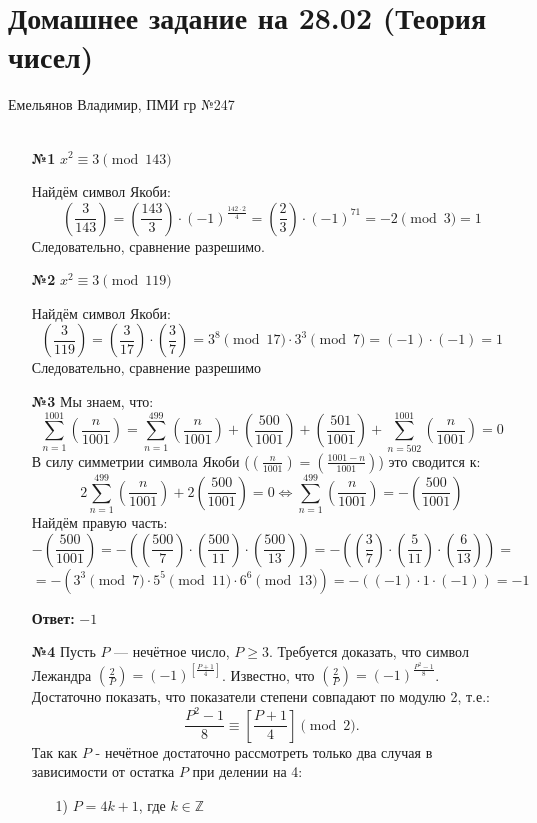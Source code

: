 \documentclass[a4paper]{article}
\renewcommand{\f}[2]{\frac{#1}{#2}}
\newcommand{\s}[2]{\sum\limits_{#1}^{#2}}
\newcommand{\lr}{\Leftrightarrow}
\renewcommand{\geq}{\geqslant}
\newcommand{\leg}[2]{\left(\f{#1}{#2}\right)}
\begin{document}
\section*{Домашнее задание на 28.02 (Теория чисел)}
 {\large Емельянов Владимир, ПМИ гр №247}\\\\
\begin{enumerate}
    \item[\textbf{№1}]$x^2 \equiv 3 \pmod{143}$
    
    Найдём символ Якоби:
    $$\leg{3}{143} = \leg{143}{3}\cdot (-1)^{\f{142\cdot2}{4}} = \leg{2}{3}\cdot (-1)^{71} = -2 \pmod{3} = 1$$
    Следовательно, сравнение разрешимо.

    \item[\textbf{№2}]$x^2 \equiv 3 \pmod{119}$
    
    Найдём символ Якоби:
    $$\leg{3}{119} = \leg{3}{17}\cdot \leg{3}{7} = 3^{8}\pmod{17} \cdot 3^{3}\pmod{7} = (-1) \cdot (-1) =1 $$
    Следовательно, сравнение разрешимо

    \item[\textbf{№3}]Мы знаем, что:
    $$\s{n=1}{1001}\leg{n}{1001} = \s{n=1}{499}\leg{n}{1001} +\leg{500}{1001}+\leg{501}{1001} +\s{n=502}{1001}\leg{n}{1001} = 0$$
    В силу симметрии символа Якоби ($\leg{n}{1001} = \leg{1001-n}{1001}$) это сводится к:
    $$2\s{n=1}{499}\leg{n}{1001} +2\leg{500}{1001} = 0 \lr  \s{n=1}{499}\leg{n}{1001} = -\leg{500}{1001} $$
    Найдём правую часть:
    $$-\leg{500}{1001} = -(\leg{500}{7} \cdot \leg{500}{11} \cdot \leg{500}{13}) = -(\leg{3}{7} \cdot \leg{5}{11} \cdot \leg{6}{13}) = $$
    $$=-(3^3 \pmod{7} \cdot 5^5 \pmod{11} \cdot 6^6\pmod{13}) = -((-1)\cdot 1 \cdot (-1)) = -1$$

    \textbf{Ответ: } $-1$\\

    \item[\textbf{№4}]
    Пусть \( P \) — нечётное число, \( P \geq 3 \). Требуется доказать, что символ Лежандра \( \left( \frac{2}{P} \right) = (-1)^{\left[ \frac{P+1}{4} \right]} \). Известно, что \( \left( \frac{2}{P} \right) = (-1)^{\frac{P^2 - 1}{8}} \). Достаточно показать, что показатели степени совпадают по модулю 2, т.е.:
    \[
    \frac{P^2 - 1}{8} \equiv \left[ \frac{P + 1}{4} \right] \pmod{2}.
    \]
    Так как $P$ - нечётное достаточно рассмотреть только два случая в зависимости от остатка \( P \) при делении на 4:
    \begin{enumerate}
        \item[1)]\( P = 4k + 1 \), где \( k \in \mathbb{Z} \)
        

\end{enumerate}
\end{enumerate}
\end{document}
